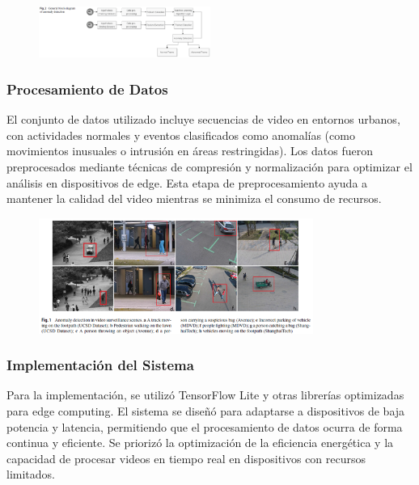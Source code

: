 \documentclass[listof=nochaptergap,12pt,times,authoryear]{report}
\begin{document}
\begin{figure}[h] %
    \centering
    \includegraphics[width=0.5\textwidth]{met4.1.png} %
    \label{fig:ejemplo} %
\end{figure}


\subsubsection{Procesamiento de Datos}
El conjunto de datos utilizado incluye secuencias de video en entornos urbanos, con actividades normales y eventos clasificados como anomalías (como movimientos inusuales o intrusión en áreas restringidas). Los datos fueron preprocesados mediante técnicas de compresión y normalización para optimizar el análisis en dispositivos de edge. Esta etapa de preprocesamiento ayuda a mantener la calidad del video mientras se minimiza el consumo de recursos.

\begin{figure}[h] %
    \centering
    \includegraphics[width=0.8\textwidth]{pro4.png} %
    \label{fig:ejemplo} %
\end{figure}



\subsubsection{Implementación del Sistema}
Para la implementación, se utilizó TensorFlow Lite y otras librerías optimizadas para edge computing. El sistema se diseñó para adaptarse a dispositivos de baja potencia y latencia, permitiendo que el procesamiento de datos ocurra de forma continua y eficiente. Se priorizó la optimización de la eficiencia energética y la capacidad de procesar videos en tiempo real en dispositivos con recursos limitados.
\end{document}
